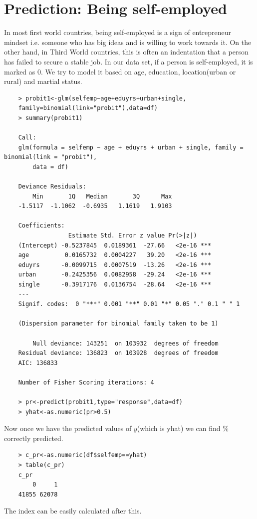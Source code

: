 \documentclass[notoc]{tufte-book}
\begin{document}
\section{Prediction: Being self-employed}
In most first world countries, being self-employed is a sign of entrepreneur mindset i.e. someone who has big ideas and is willing to work towards it. On the other hand, in Third World countries, this is often an indentation that a person has failed to secure a stable job. In our data set, if a person is self-employed, it is marked as 0. We try to model it based on age, education, location(urban or rural) and martial status. 
\begin{lstlisting}
    > probit1<-glm(selfemp~age+eduyrs+urban+single,
    family=binomial(link="probit"),data=df)
    > summary(probit1)
    
    Call:
    glm(formula = selfemp ~ age + eduyrs + urban + single, family = binomial(link = "probit"), 
        data = df)
    
    Deviance Residuals: 
        Min       1Q   Median       3Q      Max  
    -1.5117  -1.1062  -0.6935   1.1619   1.9103  
    
    Coefficients:
                  Estimate Std. Error z value Pr(>|z|)    
    (Intercept) -0.5237845  0.0189361  -27.66   <2e-16 ***
    age          0.0165732  0.0004227   39.20   <2e-16 ***
    eduyrs      -0.0099715  0.0007519  -13.26   <2e-16 ***
    urban       -0.2425356  0.0082958  -29.24   <2e-16 ***
    single      -0.3917176  0.0136754  -28.64   <2e-16 ***
    ---
    Signif. codes:  0 "***" 0.001 "**" 0.01 "*" 0.05 "." 0.1 " " 1
    
    (Dispersion parameter for binomial family taken to be 1)
    
        Null deviance: 143251  on 103932  degrees of freedom
    Residual deviance: 136823  on 103928  degrees of freedom
    AIC: 136833
    
    Number of Fisher Scoring iterations: 4
    
    > pr<-predict(probit1,type="response",data=df)
    > yhat<-as.numeric(pr>0.5)
\end{lstlisting}
Now once we have the predicted values of $y$(which is yhat) we can find $\%$ correctly  predicted.
\begin{lstlisting}
    > c_pr<-as.numeric(df$selfemp==yhat)
    > table(c_pr)
    c_pr
        0     1 
    41855 62078 
\end{lstlisting}
The index can be easily calculated after this. 
\end{document}

